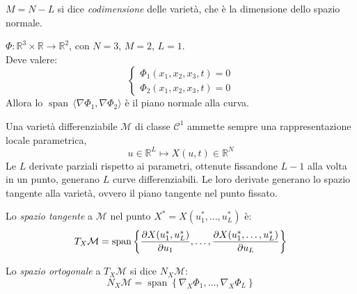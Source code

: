 \begin{definition}
    $M= N-L $ si dice \textit{codimensione} delle varietà, che è la dimensione dello spazio normale.
\end{definition}

\begin{example}
    \(\Phi: \mathbb{R}^3 \times \mathbb{R} \rightarrow \mathbb{R}^2\), con \(N = 3\), \(M = 2\), \(L = 1\).\\
    Deve valere:
    \begin{equation*}
        \begin{cases}
            \Phi_1(x_1,x_2,x_3,t) = 0\\
            \Phi_2(x_1,x_2,x_3,t) = 0
        \end{cases}
    \end{equation*}
    Allora lo $\operatorname{span} \,\langle \nabla \Phi_1, \nabla \Phi_2 \rangle $ è il piano normale alla curva.
\end{example}

\begin{remark}
    Una varietà differenziabile $\mathcal{M}$ di classe $\mathcal{C}^1$ ammette sempre una rappresentazione locale parametrica,
    \begin{equation*}
        u \in \mathbb{R}^L \mapsto X(u, t) \in \mathbb{R}^N
    \end{equation*}
    Le $L$ derivate parziali rispetto ai parametri, ottenute fissandone $L-1$ alla volta in un punto, generano $L$ curve differenziabili. Le loro derivate generano lo spazio tangente alla varietà, ovvero il piano tangente nel punto fissato.
\end{remark}

\begin{definition}
    Lo \textit{spazio tangente} a $\mathcal{M}$ nel punto $X^\ast = X(u_1^\ast,\dots, u_L^\ast)$ è:
    \begin{equation*}
        T_X \mathcal{M} = \operatorname{span} \left\{ \pdv{X(u_1^\ast, u_L^\ast)}{u_1},\dots, \pdv{X(u_1^\ast,\dots, u_L^\ast)}{u_L} \right\}
    \end{equation*}
\end{definition}

\begin{definition}
    Lo \textit{spazio ortogonale} a $T_X \mathcal{M}$ si dice $N_X \mathcal{M}$:
    \begin{equation*}
        N_X \mathcal{M} = \operatorname{span} \left\{ \nabla_X \Phi_1,\dots, \nabla_X \Phi_L  \right\}
    \end{equation*}
\end{definition}

